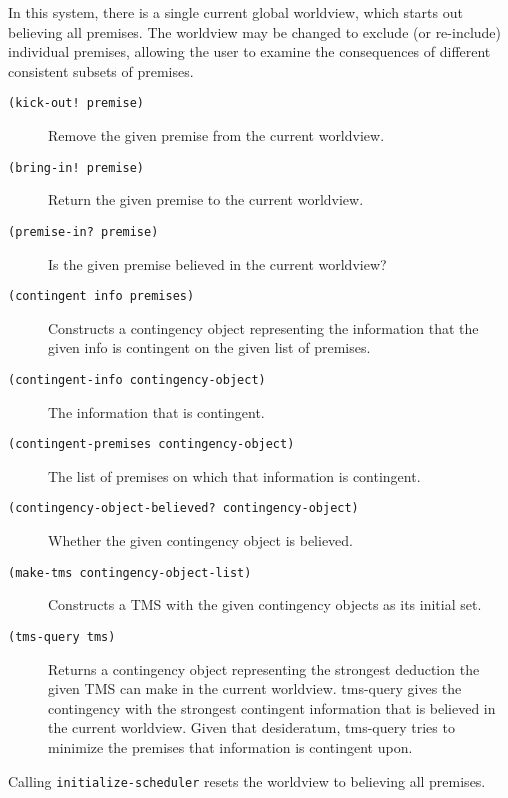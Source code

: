 \documentclass[12pt,letterpaper,english]{article}
\begin{document}
In this system, there is a single current global worldview, which
starts out believing all premises.  The worldview may be changed to
exclude (or re-include) individual premises, allowing the user to
examine the consequences of different consistent subsets of premises.
\begin{description}
\item[{\texttt{(kick-out! premise)}}] \leavevmode 
Remove the given premise from the current worldview.

\item[{\texttt{(bring-in! premise)}}] \leavevmode 
Return the given premise to the current worldview.

\item[{\texttt{(premise-in? premise)}}] \leavevmode 
Is the given premise believed in the current worldview?

\item[{\texttt{(contingent info premises)}}] \leavevmode 
Constructs a contingency object representing the information
that the given info is contingent on the given list of premises.

\item[{\texttt{(contingent-info contingency-object)}}] \leavevmode 
The information that is contingent.

\item[{\texttt{(contingent-premises contingency-object)}}] \leavevmode 
The list of premises on which that information is contingent.

\item[{\texttt{(contingency-object-believed? contingency-object)}}] \leavevmode 
Whether the given contingency object is believed.

\item[{\texttt{(make-tms contingency-object-list)}}] \leavevmode 
Constructs a TMS with the given contingency objects as its initial
set.

\item[{\texttt{(tms-query tms)}}] \leavevmode 
Returns a contingency object representing the strongest deduction
the given TMS can make in the current worldview.  tms-query gives
the contingency with the strongest contingent information that is
believed in the current worldview.  Given that desideratum,
tms-query tries to minimize the premises that information is
contingent upon.

\end{description}

Calling \texttt{initialize-scheduler} resets the worldview to believing all
premises.
\end{document}

